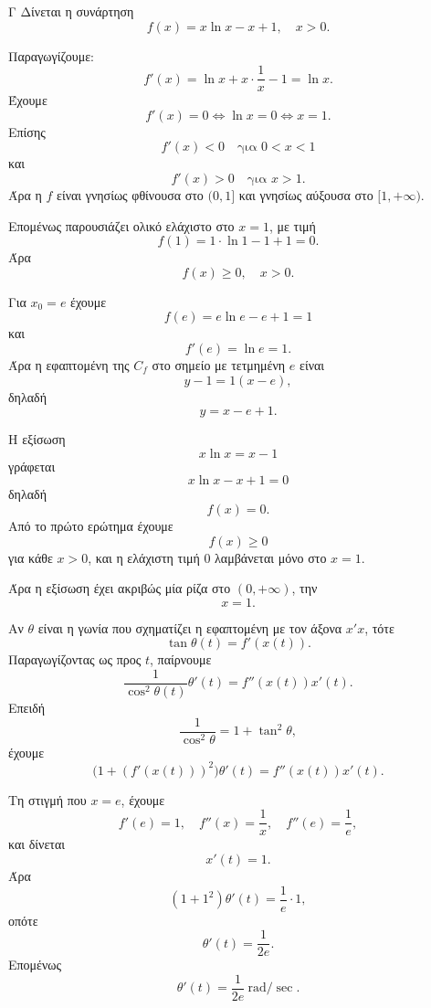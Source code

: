 \begin{thema}{Γ}
Δίνεται η συνάρτηση
\[
f(x)=x\ln x-x+1,\quad x>0.
\]
\begin{erwthma}
\item Παραγωγίζουμε:
\[
f'(x)=\ln x+x\cdot\frac1x-1=\ln x.
\]
Έχουμε
\[
f'(x)=0\Leftrightarrow \ln x=0\Leftrightarrow x=1.
\]
Επίσης
\[
f'(x)<0\quad\text{για }0<x<1
\]
και
\[
f'(x)>0\quad\text{για }x>1.
\]
Άρα η $f$ είναι γνησίως φθίνουσα στο $(0,1]$ και γνησίως αύξουσα στο $[1,+\infty)$.

Επομένως παρουσιάζει ολικό ελάχιστο στο $x=1$, με τιμή
\[
f(1)=1\cdot\ln1-1+1=0.
\]
Άρα
\[
{f(x)\geq0,\quad x>0}.
\]

\item Για $x_0=e$ έχουμε
\[
f(e)=e\ln e-e+1=1
\]
και
\[
f'(e)=\ln e=1.
\]
Άρα η εφαπτομένη της $C_f$ στο σημείο με τετμημένη $e$ είναι
\[
y-1=1(x-e),
\]
δηλαδή
\[
{y=x-e+1}.
\]

\item Η εξίσωση
\[
x\ln x=x-1
\]
γράφεται
\[
x\ln x-x+1=0
\]
δηλαδή
\[
f(x)=0.
\]
Από το πρώτο ερώτημα έχουμε
\[
f(x)\geq0
\]
για κάθε $x>0$, και η ελάχιστη τιμή $0$ λαμβάνεται μόνο στο $x=1$.

Άρα η εξίσωση έχει ακριβώς μία ρίζα στο $(0,+\infty)$, την
\[
{x=1}.
\]

\item Αν $\theta$ είναι η γωνία που σχηματίζει η εφαπτομένη με τον άξονα $x'x$, τότε
\[
\tan\theta(t)=f'(x(t)).
\]
Παραγωγίζοντας ως προς $t$, παίρνουμε
\[
\frac{1}{\cos^2\theta(t)}\theta'(t)=f''(x(t))x'(t).
\]
Επειδή
\[
\frac{1}{\cos^2\theta}=1+\tan^2\theta,
\]
έχουμε
\[
\bigl(1+(f'(x(t)))^2\bigr)\theta'(t)=f''(x(t))x'(t).
\]

Τη στιγμή που $x=e$, έχουμε
\[
f'(e)=1,\quad f''(x)=\frac1x,\quad f''(e)=\frac1e,
\]
και δίνεται
\[
x'(t)=1.
\]
Άρα
\[
(1+1^2)\theta'(t)=\frac1e\cdot1,
\]
οπότε
\[
\theta'(t)=\frac{1}{2e}.
\]
Επομένως
\[
{\theta'(t)=\frac{1}{2e}\ \text{rad}/\sec}.
\]
\end{erwthma}
\end{thema}

